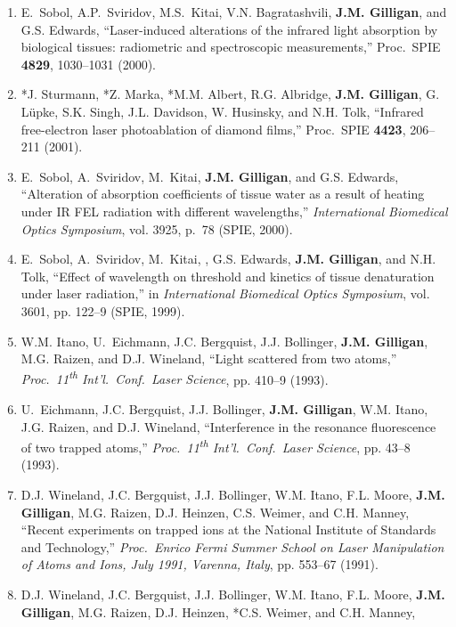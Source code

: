 \begin{enumerate}
%  
    \item
    E.~Sobol, A.P.~Sviridov, M.S.~Kitai, V.N. Bagratashvili, \textbf{J.M. Gilligan}, and G.S. Edwards, 
    \enquote{Laser-induced alterations of the infrared light absorption by biological tissues: radiometric and spectroscopic measurements,}  
    Proc.~SPIE \textbf{4829}, 1030--1031 (2000). 
%
    \item
    *J. Sturmann, *Z. Marka, *M.M. Albert, R.G. Albridge, \textbf{J.M. Gilligan}, G. L\"upke, S.K. Singh, J.L. Davidson, W. Husinsky, and N.H. Tolk,
    \enquote{Infrared free-electron laser photoablation of diamond films,} 
    Proc.~SPIE \textbf{4423}, 206--211 (2001).
%
    \item
    E.~Sobol, A.~Sviridov, M.~Kitai, \textbf{J.M. Gilligan}, and G.S. Edwards,
    \enquote{Alteration of absorption coefficients of tissue water as a result of heating under {IR} {FEL} radiation with different wavelengths,}  
    \emph{International Biomedical Optics Symposium}, vol. 3925, p.~78 (SPIE, 2000). 
%
    \item
    E.~Sobol, A.~Sviridov, M.~Kitai, , G.S. Edwards, \textbf{J.M. Gilligan}, and N.H. Tolk, 
    \enquote{Effect of wavelength on threshold and kinetics of tissue denaturation under laser radiation,}  
      in \emph{International Biomedical Optics Symposium}, vol. 3601, pp. 122--9 (SPIE, 1999). 
%
    \item
    W.M. Itano, U.~Eichmann, J.C. Bergquist, J.J. Bollinger, \textbf{J.M. Gilligan}, M.G. Raizen, and D.J. Wineland,
    \enquote{Light scattered from two atoms,}  
    \emph{Proc.\ 11\textsuperscript{th} Int'l.\ Conf.\ Laser Science},
    pp. 410--9 (1993). 
%
    \item
    U.~Eichmann, J.C. Bergquist, J.J. Bollinger, \textbf{J.M. Gilligan}, W.M. Itano, J.G. Raizen, and D.J. Wineland, 
    \enquote{Interference in the resonance fluorescence of two trapped atoms,}
    \emph{Proc.\ 11\textsuperscript{th} Int'l.\ Conf.\ Laser Science}, pp. 43--8 (1993). 
%
    \item
    D.J. Wineland, J.C. Bergquist, J.J. Bollinger, W.M. Itano, F.L. Moore, \textbf{J.M. Gilligan}, M.G. Raizen, D.J. Heinzen, C.S. Weimer, and C.H. Manney, 
    \enquote{Recent experiments on trapped ions at the {N}ational {I}nstitute of {S}tandards and {T}echnology,}  
    \emph{Proc.\ Enrico Fermi Summer School on Laser Manipulation of Atoms and Ions, {J}uly 1991, {V}arenna, {I}taly}, pp. 553--67 (1991). 
%
    \item
    D.J. Wineland, J.C. Bergquist, J.J. Bollinger, W.M. Itano, F.L. Moore, \textbf{J.M. Gilligan}, M.G. Raizen, D.J. Heinzen, *C.S. Weimer, and C.H. Manney,

\end{enumerate}
